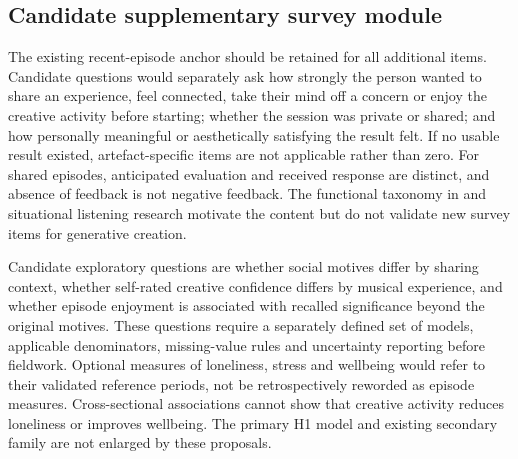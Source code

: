 \documentclass[11pt,a4paper]{article}
\begin{document}
\subsection{Candidate supplementary survey module}
The existing recent-episode anchor should be retained for all additional items. Candidate questions would separately ask how strongly the person wanted to share an experience, feel connected, take their mind off a concern or enjoy the creative activity before starting; whether the session was private or shared; and how personally meaningful or aesthetically satisfying the result felt. If no usable result existed, artefact-specific items are not applicable rather than zero. For shared episodes, anticipated evaluation and received response are distinct, and absence of feedback is not negative feedback. The functional taxonomy in \citet{schafer2013} and situational listening research \citep{henry2024} motivate the content but do not validate new survey items for generative creation.

Candidate exploratory questions are whether social motives differ by sharing context, whether self-rated creative confidence differs by musical experience, and whether episode enjoyment is associated with recalled significance beyond the original motives. These questions require a separately defined set of models, applicable denominators, missing-value rules and uncertainty reporting before fieldwork. Optional measures of loneliness, stress and wellbeing would refer to their validated reference periods, not be retrospectively reworded as episode measures. Cross-sectional associations cannot show that creative activity reduces loneliness or improves wellbeing. The primary H1 model and existing secondary family are not enlarged by these proposals.
\end{document}
